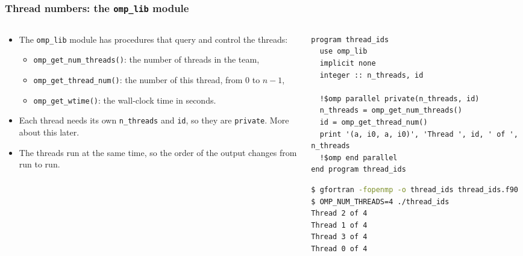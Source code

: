 \begin{frame}[fragile]
  \frametitle{Thread numbers: the \texttt{omp\_lib} module}
  \begin{columns}[T]
    \begin{column}{0.45\textwidth}
      \begin{itemize}
        \item The \texttt{omp\_lib} module has procedures that query and control the threads:
          \begin{itemize}
            \item \texttt{omp\_get\_num\_threads()}: the number of threads in the team,
            \item \texttt{omp\_get\_thread\_num()}: the number of this thread, from 0 to $n-1$,
            \item \texttt{omp\_get\_wtime()}: the wall-clock time in seconds.
          \end{itemize}
        \item Each thread needs its own \texttt{n\_threads} and \texttt{id}, so they are \texttt{private}. More about this later.
        \item The threads run at the same time, so the order of the output changes from run to run.
      \end{itemize}
    \end{column}

    \begin{column}{0.55\textwidth}
      \begin{lstlisting}
program thread_ids
  use omp_lib
  implicit none
  integer :: n_threads, id

  !$omp parallel private(n_threads, id)
  n_threads = omp_get_num_threads()
  id = omp_get_thread_num()
  print '(a, i0, a, i0)', 'Thread ', id, ' of ', n_threads
  !$omp end parallel
end program thread_ids
      \end{lstlisting}

      \begin{lstlisting}[language=bash]
$ gfortran -fopenmp -o thread_ids thread_ids.f90
$ OMP_NUM_THREADS=4 ./thread_ids
Thread 2 of 4
Thread 1 of 4
Thread 3 of 4
Thread 0 of 4
      \end{lstlisting}
    \end{column}
  \end{columns}
\end{frame}



